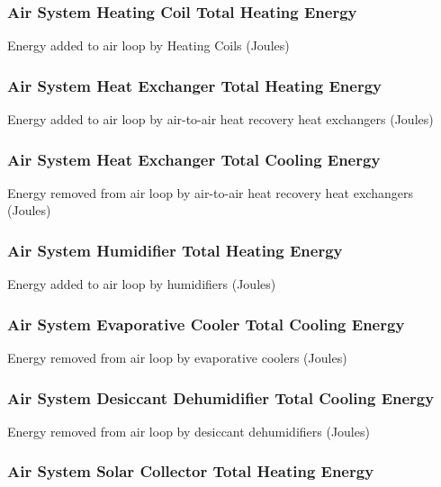 \subsubsection{Air System Heating Coil Total Heating Energy}\label{air-system-heating-coil-total-heating-energy}

Energy added to air loop by Heating Coils (Joules)

\subsubsection{Air System Heat Exchanger Total Heating Energy}\label{air-system-heat-exchanger-total-heating-energy}

Energy added to air loop by air-to-air heat recovery heat exchangers (Joules)

\subsubsection{Air System Heat Exchanger Total Cooling Energy}\label{air-system-heat-exchanger-total-cooling-energy}

Energy removed from air loop by air-to-air heat recovery heat exchangers (Joules)

\subsubsection{Air System Humidifier Total Heating Energy}\label{air-system-humidifier-total-heating-energy}

Energy added to air loop by humidifiers (Joules)

\subsubsection{Air System Evaporative Cooler Total Cooling Energy}\label{air-system-evaporative-cooler-total-cooling-energy}

Energy removed from air loop by evaporative coolers (Joules)

\subsubsection{Air System Desiccant Dehumidifier Total Cooling Energy}\label{air-system-desiccant-dehumidifier-total-cooling-energy}

Energy removed from air loop by desiccant dehumidifiers (Joules)

\subsubsection{Air System Solar Collector Total Heating Energy}\label{air-system-solar-collector-total-heating-energy}


